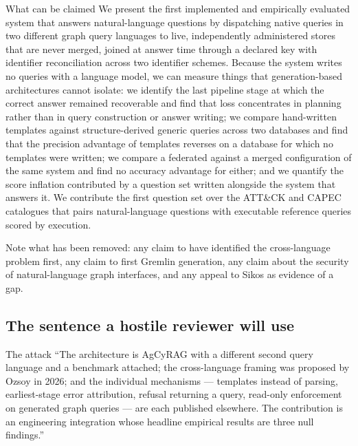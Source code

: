 \documentclass[11pt,a4paper]{article}
\begin{document}
\begin{keybox}{What can be claimed}
We present the first implemented and empirically evaluated system that answers
natural-language questions by dispatching native queries in two different graph
query languages to live, independently administered stores that are never merged,
joined at answer time through a declared key with identifier reconciliation across
two identifier schemes. Because the system writes no queries with a language model,
we can measure things that generation-based architectures cannot isolate: we
identify the last pipeline stage at which the correct answer remained recoverable
and find that loss concentrates in planning rather than in query construction or
answer writing; we compare hand-written templates against structure-derived generic
queries across two databases and find that the precision advantage of templates
reverses on a database for which no templates were written; we compare a federated
against a merged configuration of the same system and find no accuracy advantage
for either; and we quantify the score inflation contributed by a question set
written alongside the system that answers it. We contribute the first question set
over the ATT\&CK and CAPEC catalogues that pairs natural-language questions with
executable reference queries scored by execution.
\end{keybox}

Note what has been removed: any claim to have identified the cross-language problem
first, any claim to first Gremlin generation, any claim about the security of
natural-language graph interfaces, and any appeal to Sikos as evidence of a gap.

\subsection{The sentence a hostile reviewer will use}

\begin{alertbox}{The attack}
``The architecture is AgCyRAG with a different second query language and a benchmark
attached; the cross-language framing was proposed by Ozsoy in 2026; and the
individual mechanisms --- templates instead of parsing, earliest-stage error
attribution, refusal returning a query, read-only enforcement on generated graph
queries --- are each published elsewhere. The contribution is an engineering
integration whose headline empirical results are three null findings.''
\end{alertbox}
\end{document}
